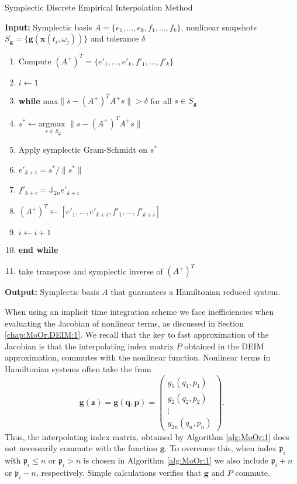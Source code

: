 \begin{algorithm} 
\caption{Symplectic Discrete Empirical Interpolation Method} \label{alg:SyMo:4}
{\bf Input:} Symplectic basis $A=\{ e_1,\dots,e_k,f_1,\dots,f_k \}$, nonlinear snapshots $S_{\mathbf g} = \{ \mathbf g(\mathbf x(t_i,\omega_j)) \}$ and tolerance $\delta$
\begin{enumerate}
\item Compute $(A^+)^T = \{ e'_1,\dots,e'_k,f'_1,\dots,f'_k \}$
\item $i \leftarrow 1$
\item \textbf{while} max$\| s - (A^+)^T A^+s \| > \delta$ for all $s\in S_{\mathbf g}$
\item \hspace{0.5cm} $s^* \leftarrow \underset{s \in S_{\mathbf g}}{\text{argmax }}\| s - (A^+)^T A^+ s \|$
\item \hspace{0.5cm} Apply symplectic Gram-Schmidt on $s^*$
\item \hspace{0.5cm} $e'_{k+i} = s^* / \| s^* \|$
\item \hspace{0.5cm} $f'_{k+i} = \mathbb J_{2n} e'_{k+i}$
\item \hspace{0.5cm} $(A^+)^T \leftarrow [e'_1,\dots,e'_{k+i},f'_1,\dots,f'_{k+i}]$
\item \hspace{0.5cm} $i\leftarrow i+1$
\item \textbf{end while}
\item take transpose and symplectic inverse of $(A^+)^T$
\end{enumerate}
\vspace{0.5cm}
{\bf Output:} Symplectic basis $A$ that guarantees a Hamiltonian reduced system.
\end{algorithm}

When using an implicit time integration scheme we face inefficiencies when evaluating the Jacobian of nonlinear terms, as discussed in Section \ref{chap:MoOr.DEIM:1}. We recall that the key to fast approximation of the Jacobian is that the interpolating index matrix $P$ obtained in the DEIM approximation, commutes with the nonlinear function. Nonlinear terms in Hamiltonian systems often take the from
\begin{equation}
	\mathbf g (\mathbf z) = \mathbf g (\mathbf q,\mathbf p) = 
	\begin{pmatrix}
		g_1(q_1,p_1) \\
		g_2(q_2,p_2) \\
		\vdots \\
		g_{2n}(q_{n},p_{n})
	\end{pmatrix}.
\end{equation}
Thus, the interpolating index matrix, obtained by Algorithm \ref{alg:MoOr:1} does not necessarily commute with the function $\mathbf g$. To overcome this, when index $\mathfrak p_i$ with $\mathfrak p_i\leq n$ or $\mathfrak p_i>n$ is chosen in Algorithm \ref{alg:MoOr:1} we also include $\mathfrak p_i + n$ or $\mathfrak p_i-n$, respectively. {\edit Simple calculations verifies that $\mathbf g$ and $P$ commute.}
